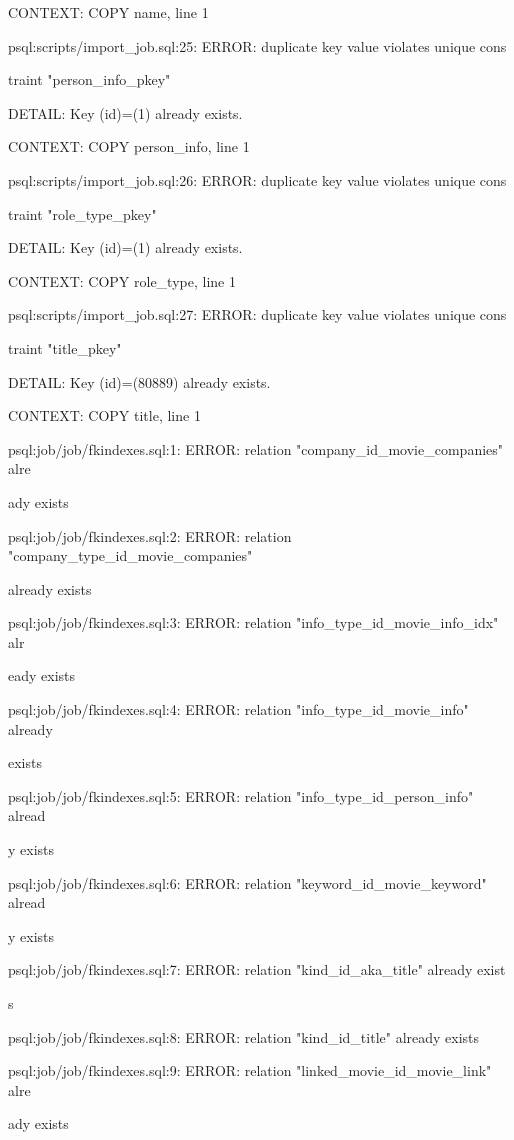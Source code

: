 \documentclass[11pt,a4paper]{article}
\begin{document}
CONTEXT:  COPY name, line 1

psql:scripts/import\_job.sql:25: ERROR:  duplicate key value violates unique cons

traint "person\_info\_pkey"

DETAIL:  Key (id)=(1) already exists.

CONTEXT:  COPY person\_info, line 1

psql:scripts/import\_job.sql:26: ERROR:  duplicate key value violates unique cons

traint "role\_type\_pkey"

DETAIL:  Key (id)=(1) already exists.

CONTEXT:  COPY role\_type, line 1

psql:scripts/import\_job.sql:27: ERROR:  duplicate key value violates unique cons

traint "title\_pkey"

DETAIL:  Key (id)=(80889) already exists.

CONTEXT:  COPY title, line 1

psql:job/job/fkindexes.sql:1: ERROR:  relation "company\_id\_movie\_companies" alre

ady exists

psql:job/job/fkindexes.sql:2: ERROR:  relation "company\_type\_id\_movie\_companies"

already exists

psql:job/job/fkindexes.sql:3: ERROR:  relation "info\_type\_id\_movie\_info\_idx" alr

eady exists

psql:job/job/fkindexes.sql:4: ERROR:  relation "info\_type\_id\_movie\_info" already

exists

psql:job/job/fkindexes.sql:5: ERROR:  relation "info\_type\_id\_person\_info" alread

y exists

psql:job/job/fkindexes.sql:6: ERROR:  relation "keyword\_id\_movie\_keyword" alread

y exists

psql:job/job/fkindexes.sql:7: ERROR:  relation "kind\_id\_aka\_title" already exist

s

psql:job/job/fkindexes.sql:8: ERROR:  relation "kind\_id\_title" already exists

psql:job/job/fkindexes.sql:9: ERROR:  relation "linked\_movie\_id\_movie\_link" alre

ady exists
\end{document}
